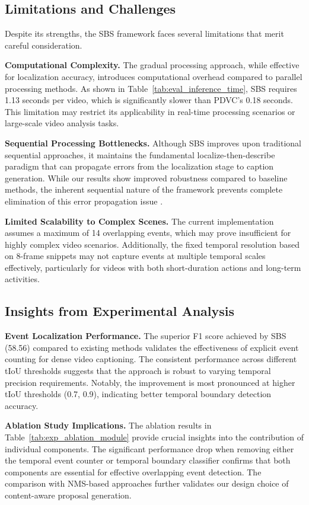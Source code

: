 \subsection{Limitations and Challenges}

Despite its strengths, the SBS framework faces several limitations that merit careful consideration.

\textbf{Computational Complexity.}
The gradual processing approach, while effective for localization accuracy, introduces computational overhead compared to parallel processing methods. As shown in Table~\ref{tab:eval_inference_time}, SBS requires 1.13 seconds per video, which is significantly slower than PDVC's 0.18 seconds. This limitation may restrict its applicability in real-time processing scenarios or large-scale video analysis tasks.

\textbf{Sequential Processing Bottlenecks.}
Although SBS improves upon traditional sequential approaches, it maintains the fundamental localize-then-describe paradigm that can propagate errors from the localization stage to caption generation. While our results show improved robustness compared to baseline methods, the inherent sequential nature of the framework prevents complete elimination of this error propagation issue \cite{wang2021end}.

\textbf{Limited Scalability to Complex Scenes.}
The current implementation assumes a maximum of 14 overlapping events, which may prove insufficient for highly complex video scenarios. Additionally, the fixed temporal resolution based on 8-frame snippets may not capture events at multiple temporal scales effectively, particularly for videos with both short-duration actions and long-term activities.

\subsection{Insights from Experimental Analysis}

\textbf{Event Localization Performance.}
The superior F1 score achieved by SBS (58.56) compared to existing methods validates the effectiveness of explicit event counting for dense video captioning. The consistent performance across different tIoU thresholds suggests that the approach is robust to varying temporal precision requirements. Notably, the improvement is most pronounced at higher tIoU thresholds (0.7, 0.9), indicating better temporal boundary detection accuracy.

\textbf{Ablation Study Implications.}
The ablation results in Table~\ref{tab:exp_ablation_module} provide crucial insights into the contribution of individual components. The significant performance drop when removing either the temporal event counter or temporal boundary classifier confirms that both components are essential for effective overlapping event detection. The comparison with NMS-based approaches further validates our design choice of content-aware proposal generation.

